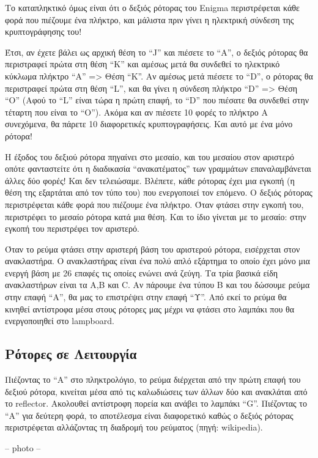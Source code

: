 \documentclass[a4paper,twoside,12pt]{article}
\begin{document}
Το καταπληκτικό όμως είναι ότι ο δεξιός ρότορας του Enigma περιστρέφεται κάθε φορά που πιέζουμε ένα πλήκτρο, και μάλιστα πριν γίνει η ηλεκτρική σύνδεση της κρυπτογράφησης του!

Έτσι, αν έχετε βάλει ως αρχική θέση το “J” και πιέσετε το “Α”, ο δεξιός ρότορας θα περιστραφεί πρώτα στη θέση “K” και αμέσως μετά θα συνδεθεί το ηλεκτρικό κύκλωμα πλήκτρο “Α” => Θέση “Κ”. Αν αμέσως μετά πιέσετε το “D”, ο ρότορας θα περιστραφεί πρώτα στη θέση “L”, και θα γίνει η σύνδεση πλήκτρο “D” => Θέση “O” (Αφού το “L” είναι τώρα η πρώτη επαφή, το “D” που πιέσατε θα συνδεθεί στην τέταρτη που είναι το “Ο”). Ακόμα και αν πιέσετε 10 φορές το πλήκτρο Α συνεχόμενα, θα πάρετε 10 διαφορετικές κρυπτογραφήσεις. Και αυτό με ένα μόνο ρότορα!

Η έξοδος του δεξιού ρότορα πηγαίνει στο μεσαίο, και του μεσαίου στον αριστερό οπότε φανταστείτε ότι η διαδικασία “ανακατέματος” των γραμμάτων επαναλαμβάνεται άλλες δύο φορές! Και δεν τελειώσαμε. Βλέπετε, κάθε ρότορας έχει μια εγκοπή (η θέση της εξαρτάται από τον τύπο του) που ενεργοποιεί τον επόμενο. Ο δεξιός ρότορας περιστρέφεται κάθε φορά που πιέζουμε ένα πλήκτρο. Όταν φτάσει στην εγκοπή του, περιστρέφει το μεσαίο ρότορα κατά μια θέση. Και το ίδιο γίνεται με το μεσαίο: στην εγκοπή του περιστρέφει τον αριστερό.

Όταν το ρεύμα φτάσει στην αριστερή βάση του αριστερού ρότορα, εισέρχεται στον ανακλαστήρα. Ο ανακλαστήρας είναι ένα πολύ απλό εξάρτημα το οποίο έχει μόνο μια ενεργή βάση με 26 επαφές τις οποίες ενώνει ανά ζεύγη. Τα τρία βασικά είδη ανακλαστήρων είναι τα Α,B και C. Αν πάρουμε ένα τύπου Β και του δώσουμε ρεύμα στην επαφή “Α”, θα μας το επιστρέψει στην επαφή “Υ”. Από εκεί το ρεύμα θα κινηθεί αντίστροφα μέσα στους ρότορες μας μέχρι να φτάσει στο λαμπάκι που θα ενεργοποιηθεί στο lampboard. 

\subsection{Ρότορες σε Λειτουργία}

Πιέζοντας το “Α” στο πληκτρολόγιο, το ρεύμα διέρχεται από την πρώτη επαφή του δεξιού ρότορα, κινείται μέσα από τις καλωδιώσεις των άλλων δύο και ανακλάται από το reflector. Ακολουθεί αντίστροφη πορεία και ανάβει το λαμπάκι “G”. Πιέζοντας το “Α” για δεύτερη φορά, το αποτέλεσμα είναι διαφορετικό καθώς ο δεξιός ρότορας περιστρέφεται αλλάζοντας τη διαδρομή του ρεύματος (πηγή: wikipedia).

-- photo --
\end{document}
